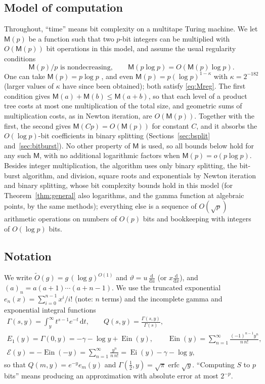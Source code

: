 \documentclass[11pt,reqno]{amsart}
\theoremstyle{definition}
\theoremstyle{remark}
\newcommand{\Ein}{\operatorname{Ein}}
\newcommand{\Eip}{\mathcal{E}}
\newcommand{\erfc}{\operatorname{erfc}}
\newcommand{\dd}{\,\mathrm{d}}
\newcommand{\Mul}{\mathsf{M}}
\begin{document}
\subsection{Model of computation}
Throughout, ``time'' means bit complexity on a multitape Turing machine. We let $\Mul(p)$ be a function such that
two $p$-bit integers can be multiplied with $O(\Mul(p))$ bit operations in this model, and assume the usual
regularity conditions
\begin{equation}\label{eq:Mreg}
  \Mul(p)/p \text{ is nondecreasing}, \qquad \Mul(p\log p) = O(\Mul(p)\log p).
\end{equation}
One can take $\Mul(p) = p\log p$ \cite{HvdH21}, and even $\Mul(p) = p(\log p)^{1-\kappa}$ with $\kappa = 2^{-182}$
\cite{OAI26} (larger values of $\kappa$ have since been obtained); both satisfy \eqref{eq:Mreg}. The first condition
gives $\Mul(a) + \Mul(b) \le \Mul(a+b)$, so that each level of a product tree costs at most one multiplication of
the total size, and geometric sums of multiplication costs, as in Newton iteration, are $O(\Mul(p))$. Together with
the first, the second gives $\Mul(Cp) = O(\Mul(p))$ for constant $C$, and it absorbs the $O(\log p)$-bit
coefficients in binary splitting (Sections~\ref{sec:bsplit} and~\ref{sec:bitburst}). No other property of $\Mul$
is used, so all bounds below hold for any such $\Mul$, with no additional logarithmic factors when
$\Mul(p) = o(p\log p)$. Besides integer
multiplication, the algorithm uses only binary splitting, the bit-burst algorithm, and division, square
roots and exponentials by Newton iteration and binary splitting, whose bit complexity bounds hold in this
model \cite{BZ10} (for Theorem~\ref{thm:general} also logarithms, and the gamma function at algebraic
points, by the same methods); everything else is a sequence of $O(\sqrt p)$ arithmetic operations on numbers of $O(p)$
bits and bookkeeping with integers of $O(\log p)$ bits.

\subsection{Notation}
We write $\widetilde O(g) = g\,(\log g)^{O(1)}$ and $\vartheta = u\,\frac{\mathrm{d}}{\mathrm{d}u}$ (or
$x\frac{\mathrm{d}}{\mathrm{d}x}$), and $(a)_n = a(a+1)\cdots(a+n-1)$. We use the truncated exponential
$e_n(x) = \sum_{i=0}^{n-1} x^i/i!$ (note: $n$ terms) and the incomplete gamma and exponential integral functions
\begin{gather*}
  \Gamma(s, y) = \int_y^\infty t^{s-1}e^{-t}\dd t, \qquad Q(s,y) = \frac{\Gamma(s,y)}{\Gamma(s)}, \\
  E_1(y) = \Gamma(0, y) = -\gamma - \log y + \Ein(y), \qquad \Ein(y) = \sum_{n=1}^{\infty}\frac{(-1)^{n-1}y^n}{n\,n!}, \\
  \Eip(y) = -\Ein(-y) = \sum_{n=1}^{\infty}\frac{y^n}{n\,n!} = \operatorname{Ei}(y) - \gamma - \log y,
\end{gather*}
so that $Q(m, y) = e^{-y} e_m(y)$ and $\Gamma(\frac12, y) = \sqrt\pi\erfc\sqrt y$. ``Computing $S$ to $p$ bits''
means producing an approximation with absolute error at most $2^{-p}$.
\end{document}
